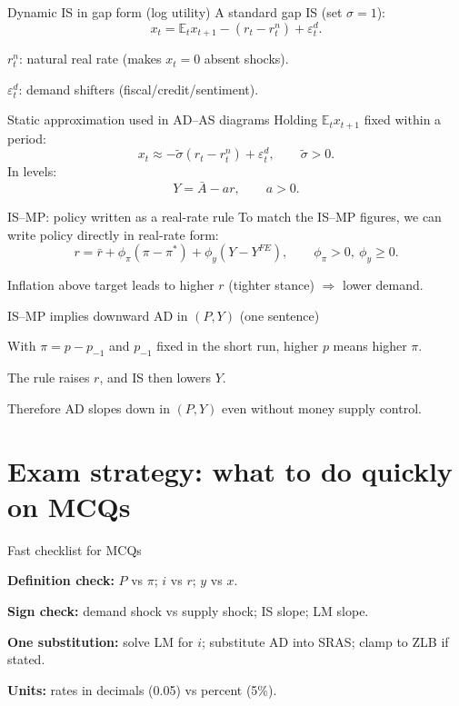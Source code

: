 \documentclass[aspectratio=169,xcolor=dvipsnames]{beamer}
\let\tempone\itemize
\let\temptwo\enditemize
\renewenvironment{itemize}{\tempone\addtolength{\itemsep}{\fill}}{\temptwo}
\let\tempa\enumerate
\let\tempb\endenumerate
\renewenvironment{enumerate}{\tempa\addtolength{\itemsep}{\fill}}{\tempb}
\begin{document}
\begin{frame}{Dynamic IS in gap form (log utility)}
A standard gap IS (set $\sigma=1$):
\[
x_t=\mathbb{E}_t x_{t+1}-(r_t-r_t^n)+\varepsilon_t^d.
\]
\begin{itemize}
\item $r_t^n$: natural real rate (makes $x_t=0$ absent shocks).
\item $\varepsilon_t^d$: demand shifters (fiscal/credit/sentiment).
\end{itemize}
\end{frame}

\begin{frame}{Static approximation used in AD--AS diagrams}
Holding $\mathbb{E}_t x_{t+1}$ fixed within a period:
\[
x_t\approx -\tilde\sigma(r_t-r_t^n)+\varepsilon_t^d,\qquad \tilde\sigma>0.
\]
In levels:
\[
Y=\bar A-a r,\qquad a>0.
\]
\end{frame}

\begin{frame}{IS--MP: policy written as a real-rate rule}
To match the IS--MP figures, we can write policy directly in real-rate form:
\[
r=\bar r+\phi_\pi(\pi-\pi^\ast)+\phi_y(Y-Y^{FE}),
\qquad \phi_\pi>0,\ \phi_y\ge 0.
\]
\begin{itemize}
\item Inflation above target leads to higher $r$ (tighter stance) $\Rightarrow$ lower demand.
\end{itemize}
\end{frame}

\begin{frame}{IS--MP implies downward AD in $(P,Y)$ (one sentence)}
\begin{itemize}
\item With $\pi=p-p_{-1}$ and $p_{-1}$ fixed in the short run, higher $p$ means higher $\pi$.
\item The rule raises $r$, and IS then lowers $Y$.
\item Therefore AD slopes down in $(P,Y)$ even without money supply control.
\end{itemize}
\end{frame}

\section[Strategy]{Exam strategy: what to do quickly on MCQs}

\begin{frame}{Fast checklist for MCQs}
\begin{enumerate}
\item \textbf{Definition check:} $P$ vs $\pi$; $i$ vs $r$; $y$ vs $x$.
\item \textbf{Sign check:} demand shock vs supply shock; IS slope; LM slope.
\item \textbf{One substitution:} solve LM for $i$; substitute AD into SRAS; clamp to ZLB if stated.
\item \textbf{Units:} rates in decimals (0.05) vs percent (5\%).
\end{enumerate}
\end{frame}
\end{document}
